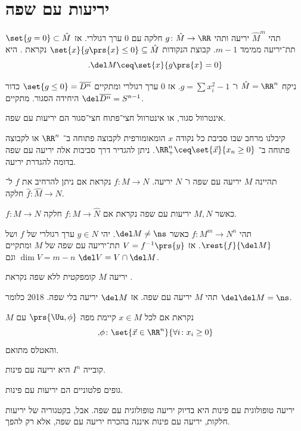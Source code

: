 \documentclass[a4paper,10pt,twoside,openany]{book}
\begin{document}
\section{יריעות עם שפה}
\begin{definition}
תהי
$\hat{M}^m$
יריעה ותהי
$g \colon \hat{M} \to \RR$
חלקה עם
$0$
ערך רגולרי.
אז
$\set{g = 0} \subset \hat{M}$
תת־יריעה ממימד
$m-1$.
קבוצת הנקודות
$\set{x}{g\prs{x} \leq 0} \subseteq \hat{M}$
נקראת
.
היא
\[\text{.} \del M \ceq \set{x}{g\prs{x} = 0}\]
\end{definition}
\begin{example}
ניקח
$\hat{M} = \RR^n$
ו־%
$g = \sum x_i^2 - 1$.
אז
$0$
ערך רגולרי ומתקיים
$\set{g \leq 0} = \overline{D^n}$
כדור היחידה הסגור.
מתקיים
$\del \overline{D^n} = S^{n-1}$.
\end{example}
\begin{example}
אינטרוול סגור, או אינטרוול חצי־פתוח חצי־סגור הם יריעות עם שפה.
\end{example}
\begin{remark}
קיבלנו מרחב שבו סביבת כל נקודה
$x$
הומאומורפית לקבוצה פתוחה ב־%
$\RR^n$
או לקבוצה פתוחה ב־%
$\RR^n_+ \ceq \set{\vec{x}}{x_n \geq 0}$.
ניתן להגדיר דרך סביבות אלה יריעה עם שפה בדומה להגדרת יריעה.
\end{remark}
\begin{definition}
תהיינה
$M$
יריעה עם שפה ו־%
$N$
יריעה.
$f \colon M \to N$
נקראת
אם ניתן להרחיב את
$f$
ל־%
$\hat{f} \colon \hat{M} \to N$
חלקה.
\end{definition}
\begin{definition}
$f \colon M \to N$
כאשר
$M,N$
יריעות עם שפה נקראת
אם
$f \colon M \to \hat{N}$
חלקה.
\end{definition}
\begin{exercise}[קשה]
תהי
$f \colon M^m \to N^n$
כאשר
$\del M \neq \ns$.
יהי
$y \in N$
ערך רגולרי של
$f$
ושל
$\rest{f}{\del M}$.
אז
$V = f^{-1}\prs{y}$
תת־יריעה עם שפה של
$M$
ומתקיים
$\dim V = m-n$
וגם
$\del V = V \cap \del M$.
\end{exercise}
\begin{definition}
יריעה
$M$
קומפקטית ללא שפה נקראת
.
\end{definition}
\begin{remark}
תהי
$M$
יריעה עם שפה. אז
$\del M$
יריעה בלי שפה.%
%
{2018}
כלומר
$\del \del M = \ns$.
\end{remark}
\begin{definition}
$M$
נקראת
אם לכל
$x \in M$
קיימת מפה
$\prs{\Uu, \phi}$
עם
\[\text{,} \phi \colon \set{\vec{x} \in \RR^n}{\forall i \colon x_i \geq 0}\]
והאטלס מתואם.
\end{definition}
\begin{example}
קובייה
$I^n$
היא יריעה עם פינות.
\end{example}
\begin{example}
גופים פלטוניים הם יריעות עם פינות.
\end{example}
\begin{remark}
יריעה טופולוגית עם פינות היא בדיוק יריעה טופולוגית עם שפה.
אבל, בקטגוריה של יריעות חלקות, יריעה עם פינות איננה בהכרח יריעה עם שפה, אלא רק להפך.
\end{remark}
\end{document}
